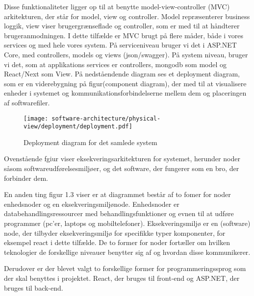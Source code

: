 Disse funktionaliteter ligger op til at benytte model-view-controller (MVC) arkitekturen, der står for model, view og controller. Model repræsenterer business loggik, view viser brugergrænseflade og controller, som er med til at håndterer brugeranmodningen. I dette tilfælde er MVC brugt på flere måder, både i vores services og med hele vores system. På serviceniveau bruger vi det i ASP.NET Core, med controllers, models og views (json/swagger). På system niveau, bruger vi det, som at applikations services er controllers, mongodb som model og React/Next som View.
\newpage
På nedståendende diagram ses et deployment diagram, som er en viderebygning på figur(component diagram), der med til at visualisere enheder i systemet og kommunikationsforbindelserne mellem dem og placeringen af softwarefiler.


\begin{figure}[H]
    \centering
\texttt{[image: software-architecture/physical-view/deployment/deployment.pdf]}
\caption{Deployment diagram for det samlede system}
\label{fig:figure2}
\end{figure}

Ovenstående fgiur viser eksekveringsarkitekturen for systemet, herunder noder såsom softwareudførelsesmiljøer, og det software, der fungerer som en bro, der forbinder dem. 

En anden ting figur 1.3 viser er at diagrammet består af to fomer for noder enhedsnoder og en eksekveringsmiljønode. Enhedsnoder er databehandlingsressourcer med behandlingsfunktioner og evnen til at udføre programmer (pc'er, laptops og mobiltelefoner).  Eksekveringsmiljø er en (software) node, der tilbyder eksekveringsmiljø for specifikke typer komponenter, for eksempel react i dette tilfælde. De to former for noder fortæller om hvilken teknologier de forskellige niveauer benytter sig af og hvordan disse kommunikerer.

Derudover er der blevet valgt to forskellige former for programmeringssprog som der skal benyttes i projektet. React, der bruges til front-end og ASP.NET, der bruges til back-end. 



